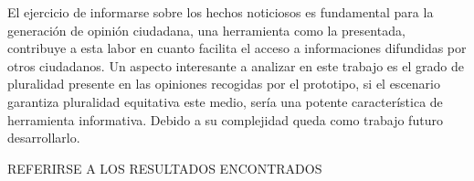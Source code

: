 El ejercicio de informarse sobre los hechos noticiosos es fundamental para la generación de opinión ciudadana, una herramienta como la presentada, contribuye a esta labor en cuanto facilita el acceso a informaciones difundidas por otros ciudadanos. Un aspecto interesante a analizar en este trabajo es el grado de pluralidad presente en las opiniones recogidas por el prototipo, si el escenario garantiza pluralidad equitativa este medio, sería una potente característica de herramienta informativa. Debido a su complejidad queda como trabajo futuro desarrollarlo.

REFERIRSE A LOS RESULTADOS ENCONTRADOS




